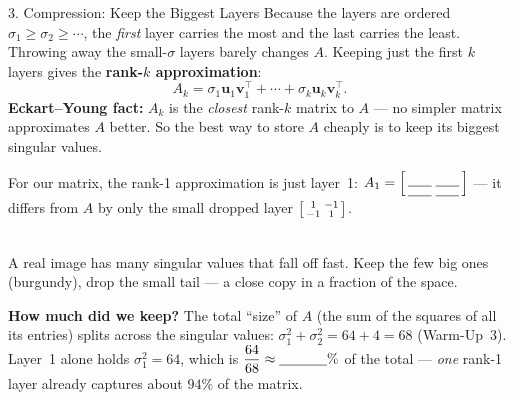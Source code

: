 \documentclass[10pt]{article}
\newcommand{\uu}{\mathbf{u}}
\newcommand{\vv}{\mathbf{v}}
\newcommand{\T}{^{\top}}
\begin{document}
\begin{notesbox}{3. Compression: Keep the Biggest Layers}
Because the layers are ordered $\sigma_1\ge\sigma_2\ge\cdots$, the \emph{first} layer carries the most and
the last carries the least. Throwing away the small-$\sigma$ layers barely changes $A$. Keeping just the
first $k$ layers gives the \textbf{rank-$k$ approximation}:
\[
  A_k=\sigma_1\uu_1\vv_1\T+\cdots+\sigma_k\uu_k\vv_k\T .
\]
\textbf{Eckart--Young fact:} $A_k$ is the \emph{closest} rank-$k$ matrix to $A$ --- no simpler matrix
approximates $A$ better. So the best way to store $A$ cheaply is to keep its biggest singular values.

\vspace{2pt}
For our matrix, the rank-1 approximation is just layer~1:
$A_1=\begin{bsmallmatrix}\rule{0pt}{1em}\blank{0.6cm} & \blank{0.6cm}\\[1pt]\blank{0.6cm} & \blank{0.6cm}\end{bsmallmatrix}$
--- it differs from $A$ by only the small dropped layer $\begin{bsmallmatrix} 1 & -1\\ -1 & 1 \end{bsmallmatrix}$.

\begin{center}
\\[-1pt]
{\scriptsize A real image has many singular values that fall off fast. Keep the few big ones (burgundy),
drop the small tail --- a close copy in a fraction of the space.}
\end{center}

\vspace{2pt}
\textbf{How much did we keep?} The total ``size'' of $A$ (the sum of the squares of all its entries) splits
across the singular values: $\sigma_1^2+\sigma_2^2=64+4=68$ (Warm-Up~3). Layer~1 alone holds $\sigma_1^2=64$,
which is $\dfrac{64}{68}\approx\blank{1.2cm}\%$ of the total --- \emph{one} rank-1 layer already captures
about $94\%$ of the matrix.
\end{notesbox}
\end{document}
